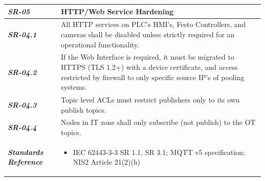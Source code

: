 \documentclass[11pt,a4paper]{article}
\begin{document}
\begin{tabularx}{\textwidth}{>{\bfseries}p{2.5cm} X}
    \textit{SR-05} & \textbf{HTTP/Web Service Hardening} \vspace{0.5em}\\
\toprule
\textit{SR-04.1} &

    All HTTP services on PLC's HMI's, Festo Controllers, and cameras shall be disabled unless strictly required for an operational functionality.
    \vspace{0.5em}
\\
\textit{SR-04.2} &
    If the Web Interface is required, it must be migrated to HTTPS (TLS 1.2+) with a device certificate, and access restricted by firewall to only specific source
    IP's of pooling systems.
    \vspace{0.5em}
    \\
\textit{SR-04.3} &
    Topic level ACLs must restrict publishers only to its own publish topics.
    \vspace{0.5em}
    \\
\textit{SR-04.4} &
    Nodes in IT zone shall only subscribe (not publish) to the OT topics.
    \vspace{0.5em}
    \\
\midrule
    \textit{Standards Reference} &
\begin{itemize}[label=-, noitemsep, topsep=0pt, leftmargin=*]
    \item IEC 62443-3-3 SR 1.1, SR 3.1; MQTT v5 specification; NIS2 Article 21(2)(h)
\end{itemize} \vspace{1em} \\ 
\end{tabularx}
\vspace{2em}
\end{document}
